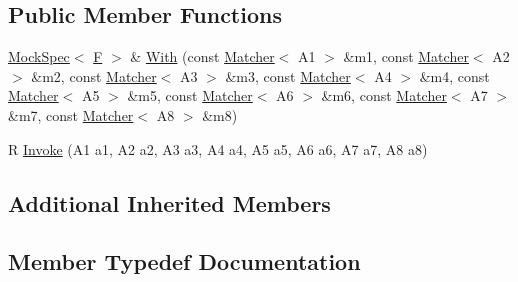 \subsection*{Public Member Functions}
\begin{DoxyCompactItemize}
\item 
\hyperlink{classtesting_1_1internal_1_1MockSpec}{Mock\+Spec}$<$ \hyperlink{classtesting_1_1internal_1_1FunctionMocker_3_01R_07A1_00_01A2_00_01A3_00_01A4_00_01A5_00_01A6_00_01A7_00_01A8_08_4_ad9749c93b0a17540778c5fa162a5fe6c}{F} $>$ \& \hyperlink{classtesting_1_1internal_1_1FunctionMocker_3_01R_07A1_00_01A2_00_01A3_00_01A4_00_01A5_00_01A6_00_01A7_00_01A8_08_4_ab2da711e67ed57fbd473cfc511935927}{With} (const \hyperlink{classtesting_1_1Matcher}{Matcher}$<$ A1 $>$ \&m1, const \hyperlink{classtesting_1_1Matcher}{Matcher}$<$ A2 $>$ \&m2, const \hyperlink{classtesting_1_1Matcher}{Matcher}$<$ A3 $>$ \&m3, const \hyperlink{classtesting_1_1Matcher}{Matcher}$<$ A4 $>$ \&m4, const \hyperlink{classtesting_1_1Matcher}{Matcher}$<$ A5 $>$ \&m5, const \hyperlink{classtesting_1_1Matcher}{Matcher}$<$ A6 $>$ \&m6, const \hyperlink{classtesting_1_1Matcher}{Matcher}$<$ A7 $>$ \&m7, const \hyperlink{classtesting_1_1Matcher}{Matcher}$<$ A8 $>$ \&m8)
\item 
R \hyperlink{classtesting_1_1internal_1_1FunctionMocker_3_01R_07A1_00_01A2_00_01A3_00_01A4_00_01A5_00_01A6_00_01A7_00_01A8_08_4_aff60c590ad791fa2a34751fe5a1e51c2}{Invoke} (A1 a1, A2 a2, A3 a3, A4 a4, A5 a5, A6 a6, A7 a7, A8 a8)
\end{DoxyCompactItemize}
\subsection*{Additional Inherited Members}


\subsection{Member Typedef Documentation}
